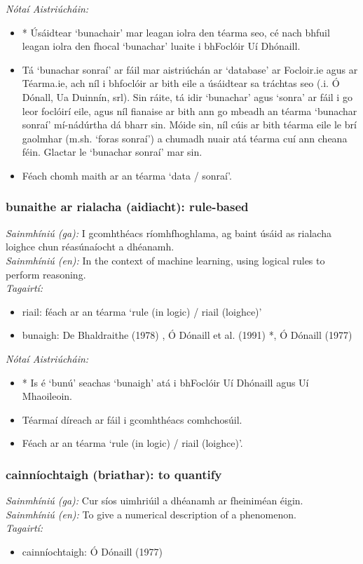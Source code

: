  \noindent \textit{Nótaí Aistriúcháin:}
\begin{itemize}
	\item * Úsáidtear `bunachair' mar leagan iolra den téarma seo, cé nach bhfuil leagan iolra den fhocal `bunachar' luaite i bhFoclóir Uí Dhónaill.
	\item Tá `bunachar sonraí' ar fáil mar aistriúchán ar `database' ar Focloir.ie agus ar Téarma.ie, ach níl i bhfoclóir ar bith eile a úsáidtear sa tráchtas seo (.i. Ó Dónall, Ua Duinnín, srl). Sin ráite, tá idir `bunachar' agus `sonra' ar fáil i go leor foclóirí eile, agus níl fianaise ar bith ann go mbeadh an téarma `bunachar sonraí' mí-nádúrtha dá bharr sin. Móide sin, níl cúis ar bith téarma eile le brí gaolmhar (m.sh. `foras sonraí') a chumadh nuair atá téarma cuí ann cheana féin. Glactar le `bunachar sonraí' mar sin.
	\item Féach chomh maith ar an téarma `data / sonraí'.
\end{itemize}


\subsubsection*{bunaithe ar rialacha (aidiacht): rule-based}
 \noindent \textit{Sainmhíniú (ga):} I gcomhthéacs ríomhfhoghlama, ag baint úsáid as rialacha loighce chun réasúnaíocht a dhéanamh.
\\
 \noindent \textit{Sainmhíniú (en):} In the context of machine learning, using logical rules to perform reasoning.
\\
 \noindent \textit{Tagairtí:}
\begin{itemize}
	\item riail: féach ar an téarma `rule (in logic) / riail (loighce)'
	\item bunaigh: De Bhaldraithe (1978) \cite{de-bhaldraithe}, Ó Dónaill et al. (1991) \cite{focloir-beag}*, Ó Dónaill (1977) \cite{odonaill}
\end{itemize}

 \noindent \textit{Nótaí Aistriúcháin:}
\begin{itemize}
	\item * Is é `bunú' seachas `bunaigh' atá i bhFoclóir Uí Dhónaill agus Uí Mhaoileoin.
	\item Téarmaí díreach ar fáil i gcomhthéacs comhchosúil.
	\item Féach ar an téarma `rule (in logic) / riail (loighce)'.
\end{itemize}


\subsubsection*{cainníochtaigh (briathar): to quantify}
 \noindent \textit{Sainmhíniú (ga):} Cur síos uimhriúil a dhéanamh ar fheiniméan éigin.
\\
 \noindent \textit{Sainmhíniú (en):} To give a numerical description of a phenomenon.
\\
 \noindent \textit{Tagairtí:}
\begin{itemize}
	\item cainníochtaigh: Ó Dónaill (1977) \cite{odonaill}
\end{itemize}

